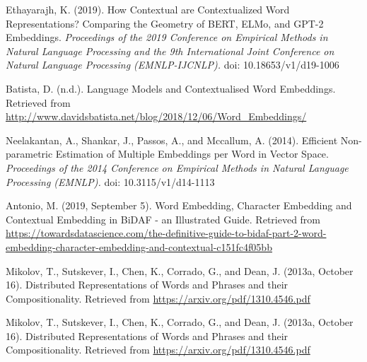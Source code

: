 \begin{frame}{}

\begin{enumerateSpaced}{2pt}
    \scriptsize
    
     \item Ethayarajh, K. (2019). How Contextual are Contextualized Word Representations? Comparing the Geometry of BERT, ELMo, and GPT-2 Embeddings. \emph{Proceedings of the 2019 Conference on Empirical Methods in Natural Language Processing and the 9th International Joint Conference on Natural Language Processing (EMNLP-IJCNLP).} doi: 10.18653/v1/d19-1006

    \item Batista, D. (n.d.). Language Models and Contextualised Word Embeddings. Retrieved from \url{http://www.davidsbatista.net/blog/2018/12/06/Word_Embeddings/}
    
    \item Neelakantan, A., Shankar, J., Passos, A., and Mccallum, A. (2014). Efficient Non-parametric Estimation of Multiple Embeddings per Word in Vector Space. \emph{Proceedings of the 2014 Conference on Empirical Methods in Natural Language Processing (EMNLP).} doi: 10.3115/v1/d14-1113
    
    \item Antonio, M. (2019, September 5). Word Embedding, Character Embedding and Contextual Embedding in BiDAF - an Illustrated Guide. Retrieved from \url{https://towardsdatascience.com/the-definitive-guide-to-bidaf-part-2-word-embedding-character-embedding-and-contextual-c151fc4f05bb}
    
    \item Mikolov, T., Sutskever, I., Chen, K., Corrado, G., and Dean, J. (2013a, October 16). Distributed Representations of Words and Phrases and their Compositionality. Retrieved from \url{https://arxiv.org/pdf/1310.4546.pdf}
    
    \item Mikolov, T., Sutskever, I., Chen, K., Corrado, G., and Dean, J. (2013a, October 16). Distributed Representations of Words and Phrases and their Compositionality. Retrieved from \url{https://arxiv.org/pdf/1310.4546.pdf}
    
    
    
    

\end{enumerateSpaced}
    
\end{frame}




